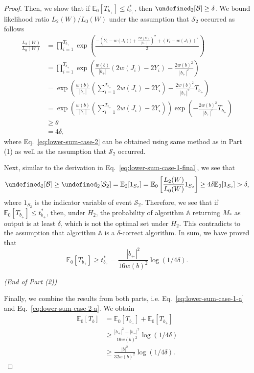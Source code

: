 \documentclass{article}
\newcommand{\E}{\mathbb E}
\let\Pr\undefined
\DeclareMathOperator{\Pr}{Pr}
\begin{document}
\begin{proof}
Then, we show that if $\E_0[T_{b_+}] \le t_{b_+}^*$, then $\Pr_2[\mathcal B] \ge \delta$.
We bound likelihood ratio $L_2(W)/L_0(W)$ under the assumption that $\mathcal S_2$ occurred as follows
\begin{align}
  \frac{L_2(W)}{L_0(W)} 
  &= \prod_{i=1}^{T_{b_+}}
  \exp\left(\frac{-\left(Y_i-w(J_i))+\frac{2w(b)}{|b_-|}\right)^2+(Y_i-w(J_i))^2}{2}\right) \nonumber \\
  &= \prod_{i=1}^{T_{b_+}}
  \exp\left(\frac{w(b)}{|b_+|}(2w(J_i)- 2Y_i)-\frac{2w(b)^2}{|b_+|^2}\right) \nonumber \\
  &= \exp\left(\frac{w(b)}{|b_+|}\left(\sum_{i=1}^{T_{b_+}}2w(J_i)-2Y_i\right)-\frac{2w(b)^2}{|b_+|^2}T_{b_+}\right) \nonumber \\
  &= \exp\left(\frac{w(b)}{|b_+|}\left(\sum_{i=1}^{T_{b_+}}2w(J_i)-2Y_i\right)\right)\exp\left(-\frac{2w(b)^2}{|b_+|^2}T_{b_+}\right) \nonumber \\
  &\ge \theta \label{eq:lower-sum-case-2}\\
  & = 4\delta \nonumber,
\end{align}
where Eq.~\eqref{eq:lower-sum-case-2} can be obtained using same method as in Part (1) as well as the assumption that $\mathcal S_2$ occurred.

Next, similar to the derivation in Eq.~\eqref{eq:lower-sum-case-1-final}, we see that
$$
\Pr_2[\mathcal B] \ge \Pr_2[\mathcal S_2] = \E_2[1_{S_2}] 
				  = \E_0\left[\frac{L_2(W)}{L_0(W)} 1_{S_2}\right]
				  \ge 4\delta \E_0[1_{S_2}] > \delta,
$$
where $1_{S_2}$ is the indicator variable of event $\mathcal S_2$.
Therefore, we see that if $\E_0[T_{b_+}] \le t_{b_+}^*$, then, under $H_2$, the probability of algorithm $\mathbb A$ returning $M_*$ as output is at least $\delta$, which is not the optimal set under $H_2$. 
This contradicts to the assumption that algorithm $\mathbb A$ is a $\delta$-correct algorithm. 
In sum, we have proved that 
\begin{equation}
\label{eq:lower-sum-case-2-a}
\E_0[T_{b_+}] \ge t_{b_+}^* = \frac{|b_+|^2}{16 w(b)^2}\log(1/4\delta).
\end{equation}

\emph{(End of Part (2))}

Finally, we combine the results from both parts, i.e. Eq.~\eqref{eq:lower-sum-case-1-a} and Eq.~\eqref{eq:lower-sum-case-2-a}.
We obtain
\begin{align*}
  \E_0[T_b] &= \E_0[T_{b_-}]+\E_0[T_{b_+}] \\
  		    &\ge \frac{|b_+|^2+|b_-|^2}{16 w(b)^2}\log(1/4\delta) \\
  		    &\ge \frac{|b|^2}{32 w(b)^2}\log(1/4\delta).
\end{align*}
\end{proof}
\end{document}
